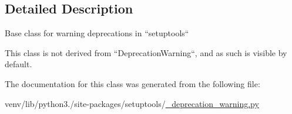 \subsection{Detailed Description}
\begin{DoxyVerb}Base class for warning deprecations in ``setuptools``

This class is not derived from ``DeprecationWarning``, and as such is
visible by default.
\end{DoxyVerb}
 

The documentation for this class was generated from the following file\+:\begin{DoxyCompactItemize}
\item 
venv/lib/python3./site-\/packages/setuptools/\hyperlink{__deprecation__warning_8py}{\+\_\+deprecation\+\_\+warning.\+py}\end{DoxyCompactItemize}
